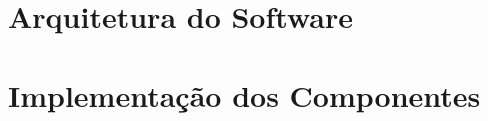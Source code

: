 \documentclass[conference]{IEEEtran}
\begin{document}


\section{Arquitetura do Software}



\section{Implementação dos Componentes}

\end{document}
